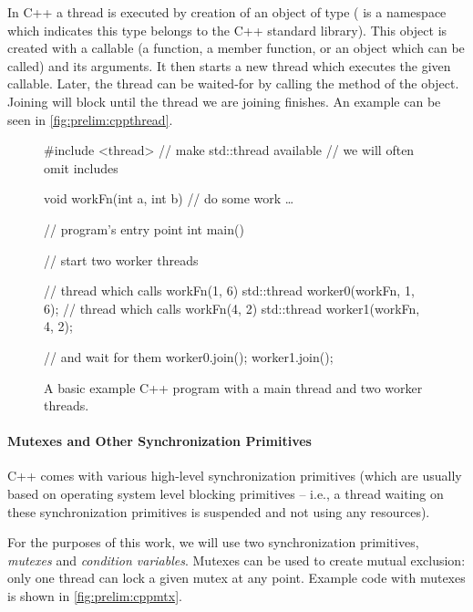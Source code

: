 In C++ a thread is executed by creation of an object of type 
( is a namespace which indicates this type belongs to the C++
standard library).
This object is created with a callable (a function, a member function, or an
object which can be called) and its arguments.
It then starts a new thread which executes the given callable.
Later, the thread can be waited-for by calling the  method of the
 object.
Joining will block until the thread we are joining finishes.
An example can be seen in \autoref{fig:prelim:cppthread}.

\begin{figure}[tp]
    \begin{cppcode}
        #include <thread> // make std::thread available
                          // we will often omit includes

        void workFn(int a, int b) {
            // do some work …
        }

        // program's entry point
        int main() {
            // start two worker threads

            // thread which calls workFn(1, 6)
            std::thread worker0(workFn, 1, 6);
            // thread which calls workFn(4, 2)
            std::thread worker1(workFn, 4, 2);

            // and wait for them
            worker0.join();
            worker1.join();
        }
    \end{cppcode}
    \caption{A basic example C++ program with a main thread and two worker
    threads.}\label{fig:prelim:cppthread}
\end{figure}

\paragraph{Mutexes and Other Synchronization Primitives}

C++ comes with various high-level synchronization primitives (which are usually
based on operating system level blocking primitives -- i.e., a thread waiting
on these synchronization primitives is suspended and not using any resources).

For the purposes of this work, we will use two synchronization primitives,
\emph{mutexes} and \emph{condition variables}.
Mutexes can be used to create mutual exclusion: only one thread can lock a
given mutex at any point.
Example code with mutexes is shown in \autoref{fig:prelim:cppmtx}.

